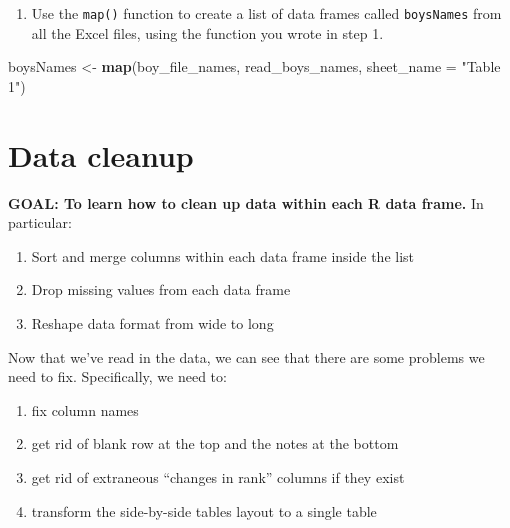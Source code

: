 \documentclass[
]{book}
\newenvironment{Shaded}{\begin{snugshade}}{\end{snugshade}}
\newcommand{\DataTypeTok}[1]{\textcolor[rgb]{0.13,0.29,0.53}{#1}}
\newcommand{\KeywordTok}[1]{\textcolor[rgb]{0.13,0.29,0.53}{\textbf{#1}}}
\newcommand{\NormalTok}[1]{#1}
\newcommand{\StringTok}[1]{\textcolor[rgb]{0.31,0.60,0.02}{#1}}
\providecommand{\tightlist}{%
  \setlength{\itemsep}{0pt}\setlength{\parskip}{0pt}}
\begin{document}
\begin{alert}
\begin{enumerate}
\def\labelenumi{\arabic{enumi}.}
\setcounter{enumi}{2}
\tightlist
\item
  Use the \texttt{map()} function to create a list of data frames called \texttt{boysNames} from all the Excel files, using the function you wrote in step 1.
\end{enumerate}

\begin{Shaded}
\begin{Highlighting}[]
\NormalTok{boysNames \textless{}{-}}\StringTok{ }\KeywordTok{map}\NormalTok{(boy\_file\_names, read\_boys\_names, }\DataTypeTok{sheet\_name =} \StringTok{"Table 1"}\NormalTok{)}
\end{Highlighting}
\end{Shaded}

\end{alert}

\hypertarget{data-cleanup}{%
\section{Data cleanup}\label{data-cleanup}}

\begin{alert}

\textbf{GOAL: To learn how to clean up data within each R data frame.} In particular:

\begin{enumerate}
\def\labelenumi{\arabic{enumi}.}
\tightlist
\item
  Sort and merge columns within each data frame inside the list
\item
  Drop missing values from each data frame
\item
  Reshape data format from wide to long
\end{enumerate}

\end{alert}

Now that we've read in the data, we can see that there are some problems we need to fix. Specifically, we need to:

\begin{enumerate}
\def\labelenumi{\arabic{enumi}.}
\tightlist
\item
  fix column names
\item
  get rid of blank row at the top and the notes at the bottom
\item
  get rid of extraneous ``changes in rank'' columns if they exist
\item
  transform the side-by-side tables layout to a single table
\end{enumerate}
\end{document}
